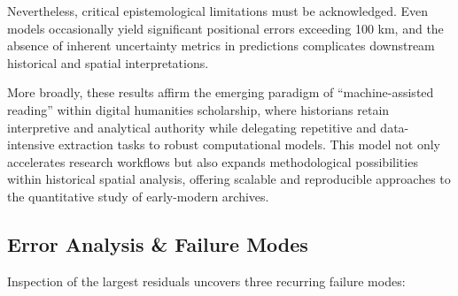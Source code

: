 Nevertheless, critical epistemological limitations must be acknowledged.
Even \DIFdelbegin {}\DIFdelend \DIFaddbegin {}\DIFaddend models occasionally yield significant
positional errors exceeding 100 km, and the absence of inherent
uncertainty metrics in predictions complicates downstream historical and
spatial interpretations.
\DIFdelbegin {}\DIFdelend 

More broadly, these results affirm the emerging paradigm of
``machine-assisted reading'' within digital humanities scholarship,
where historians retain interpretive and analytical authority while
delegating repetitive and data-intensive extraction tasks to robust
computational models. This model not only accelerates research workflows
but also expands methodological possibilities within historical spatial
analysis, offering scalable and reproducible approaches to the
quantitative study of early-modern archives.

\subsection{Error Analysis \& Failure
Modes}\label{error-analysis-failure-modes}

Inspection of the largest residuals uncovers three recurring failure
modes:

